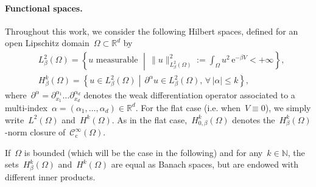 \documentclass[a4]{article}
\newcommand{\e}{\mathrm{e}}
\newcommand{\R}{\mathbb{R}}
\newcommand{\N}{\mathbb N}
\newcommand{\1}{\mathbbm 1}
\newcommand{\testfuncs}{\mathcal C^\infty_{\mathrm c}}
\newcommand{\Lmu}{L_\beta^2}
\begin{document}
        \paragraph{Functional spaces.}
                Throughout this work, we consider the following Hilbert spaces, defined for an open Lipschitz domain~$\Omega\subset \R^d$ by
                    \begin{equation}
                        \label{eq:sobolev_spaces}
                        \begin{aligned}
                        &\Lmu(\Omega) = \left\{u\text{ measurable }\middle|\,\|u\|^2_{\Lmu(\Omega)} :=\int_{\Omega} u^2 \,\e^{-\beta V} < +\infty\right\},\\
                        &H^{k}_\beta(\Omega) = \left\{u\in \Lmu(\Omega)\middle|\,\partial^{\alpha}u\in \Lmu(\Omega),\,\forall\, |\alpha|\leq k\right\},
                        \end{aligned}
                    \end{equation}
                    where~$\partial^\alpha = \partial_{x_1}^{\alpha_1}\dots\partial_{x_d}^{\alpha_d}$ denotes the weak differentiation operator associated to a multi-index~$\alpha = (\alpha_1,\dots,\alpha_d)\in \R^d$. For the flat case (i.e. when~$V\equiv 0$), we simply write~$L^2(\Omega)$ and~$H^k(\Omega)$. As in the flat case,~$H_{0,\beta}^k(\Omega)$ denotes the~$H_\beta^k(\Omega)$-norm closure of~$\testfuncs(\Omega)$.

                    If~$\Omega$ is bounded (which will be the case in the following) and for any~$k\in\N$, the sets~$H^{k}_\beta(\Omega)$ and~$H^{k}(\Omega)$ are equal as Banach spaces, but are endowed with different inner products.
\end{document}

